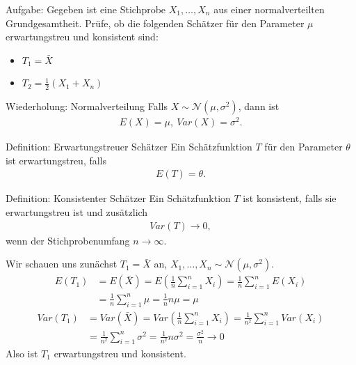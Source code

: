 \documentclass[t,11pt,aspectratio=169]{beamer}
\begin{document}
\begin{frame}
\begin{block}{Aufgabe:}
Gegeben ist eine Stichprobe $X_1,\dots,X_n$ aus einer normalverteilten Grundgesamtheit. Prüfe, ob die folgenden Schätzer für den Parameter $\mu$ erwartungstreu und konsistent sind:
\begin{itemize}
	\item $T_1 = \bar{X}$
	\item $T_2 = \frac{1}{2}(X_1+X_n)$
\end{itemize}
\end{block}
\pause
\begin{exampleblock}{Wiederholung: Normalverteilung}
Falls $X\sim\mathcal{N}(\mu,\sigma^2)$, dann ist
\begin{align*}
E(X)=\mu,~Var(X)=\sigma^2.
\end{align*}
\end{exampleblock}
\end{frame}

\begin{frame}
\begin{alertblock}{Definition: Erwartungstreuer Schätzer}
Ein Schätzfunktion $T$ für den Parameter $\theta$ ist erwartungstreu, falls
\begin{align*}
E(T)=\theta.
\end{align*}
\end{alertblock}
\pause
\begin{alertblock}{Definition: Konsistenter Schätzer}
Ein Schätzfunktion $T$ ist konsistent, falls sie erwartungstreu ist und zusätzlich
\begin{align*}
Var(T)\to 0,
\end{align*}
wenn der Stichprobenumfang $n\to\infty$.
\end{alertblock}
\end{frame}

\begin{frame}
Wir schauen uns zunächst $T_1 = \bar{X}$ an, $X_1,\dots,X_n\sim \mathcal{N}(\mu,\sigma^2)$.
\begin{align*}
E(T_1) &= E(\bar{X}) 
= E\left(\frac{1}{n}\sum_{i=1}^{n}X_i \right) 
= \frac{1}{n}\sum_{i=1}^{n}E(X_i) \\
&=  \frac{1}{n}\sum_{i=1}^{n} \mu 
= \frac{1}{n}n\mu 
= \mu
\end{align*}
\pause
\begin{align*}
Var(T_1) &= Var(\bar{X}) 
= Var\left(\frac{1}{n}\sum_{i=1}^{n}X_i \right) 
= \frac{1}{n^2}\sum_{i=1}^{n}Var(X_i) \\
&=  \frac{1}{n^2}\sum_{i=1}^{n} \sigma^2 
= \frac{1}{n^2}n\sigma^2 
= \frac{\sigma^2}{n} \to 0
\end{align*}
Also ist $T_1$ erwartungstreu und konsistent.
\end{frame}
\end{document}
